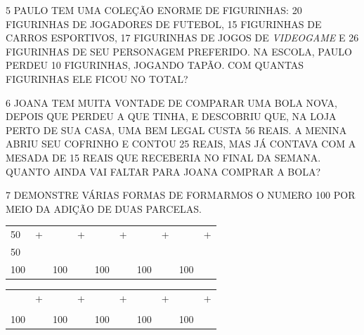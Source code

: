 


\num{5} PAULO TEM UMA COLEÇÃO ENORME DE FIGURINHAS: 20 FIGURINHAS DE
JOGADORES DE FUTEBOL, 15 FIGURINHAS DE CARROS ESPORTIVOS, 17 FIGURINHAS
DE JOGOS DE \textit{VIDEOGAME} E 26 FIGURINHAS DE SEU PERSONAGEM
PREFERIDO. NA ESCOLA, PAULO PERDEU 10 FIGURINHAS, JOGANDO TAPÃO. COM
QUANTAS FIGURINHAS ELE FICOU NO TOTAL?



\num{6} JOANA TEM MUITA VONTADE DE COMPARAR UMA BOLA NOVA, DEPOIS QUE PERDEU A QUE TINHA, E DESCOBRIU QUE, NA LOJA PERTO DE SUA CASA, UMA BEM LEGAL CUSTA 56 REAIS. A MENINA ABRIU SEU COFRINHO E CONTOU 25 REAIS, MAS JÁ CONTAVA COM A MESADA DE 15 REAIS QUE RECEBERIA NO FINAL DA SEMANA. QUANTO AINDA VAI FALTAR PARA JOANA COMPRAR A BOLA?



\num{7} DEMONSTRE VÁRIAS FORMAS DE FORMARMOS O NUMERO 100 POR MEIO DA ADIÇÃO DE
DUAS PARCELAS.

\begin{longtable}[]{@{}llllllllll@{}}
\toprule
50 & + & & + & & + & & + & & +\tabularnewline
50 & & & & & & & & &\tabularnewline
100 & & 100 & & 100 & & 100 & & 100 &\tabularnewline
\bottomrule
\end{longtable}

\begin{longtable}[]{@{}llllllllll@{}}
\toprule
& + & & + & & + & & + & & +\tabularnewline
& & & & & & & & &\tabularnewline
100 & & 100 & & 100 & & 100 & & 100 &\tabularnewline
\bottomrule
\end{longtable}


